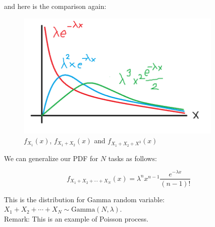 \documentclass[12pt, a4paper]{article}
\newcounter{exa}
\begin{document}
\begin{texample}
and here is the comparison again:

\begin{figure}[H]
\centering
\includegraphics[width=100mm]{30.png}
\caption{$f_{X_1}(x)$, $f_{X_1+X_2}(x)$ and $f_{X_1+X_2+X^3}(x)$}
\end{figure}

We can generalize our PDF for $N$ tasks as follows:

\[f_{X_1+X_2+\cdots+X_N}(x)=\lambda^nx^{n-1}\frac{e^{-\lambda x}}{(n-1)!}\]

This is the distribution for Gamma random variable: $X_1+X_2+\cdots+X_N\sim\text{Gamma}(N,\lambda)$. \\

Remark: This is an example of Poisson process.
\end{texample}
\end{document}
